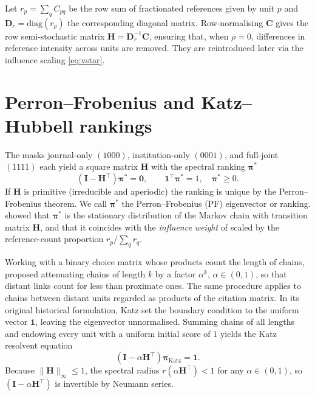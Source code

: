 Let $r_p=\sum_q C_{pq}$ be the row sum of fractionated references given by unit $p$
and $\mathbf{D}_r=\mathrm{diag}(r_p)$ the corresponding diagonal matrix.
Row-normalising $\mathbf{C}$ gives the row semi-stochastic matrix
$\mathbf{H}=\mathbf{D}_r^{-1}\mathbf{C}$, ensuring that, when $\rho = 0$, differences in reference intensity across units are removed. They are reintroduced later
via the influence scaling \eqref{eq:vstar}. 

\section{Perron--Frobenius and Katz--Hubbell rankings}
\label{sec:resolvents}

The masks journal-only $(1000)$, institution-only $(0001)$, and full-joint $(1111)$
each yield a square matrix $\mathbf{H}$ with the spectral
ranking $\boldsymbol{\pi}^*$ \citep[see][for an overview]{vignaSpectralRanking2016}
\begin{equation}
	(\mathbf{I} - \mathbf{H}^\top)\boldsymbol{\pi}^* = \mathbf{0},
	\qquad
	\mathbf{1}^\top\boldsymbol{\pi}^*=1,
	\quad
	\boldsymbol{\pi}^*\ge 0.
	\label{eq:eig}
\end{equation}
If $\mathbf{H}$ is primitive (irreducible and aperiodic) the ranking is unique by the
Perron--Frobenius theorem. We call $\boldsymbol{\pi}^*$ the Perron--Frobenius (PF) eigenvector or ranking. \textcite{gellerCitationInfluenceMethodology1978} showed that
$\boldsymbol{\pi}^*$ is the stationary distribution of the
Markov chain with transition matrix $\mathbf{H}$, and that it coincides
with the \textit{influence weight} of \textcite{pinskiCitationInfluenceJournal1976}
scaled by the reference-count proportion $r_p / \sum_q r_q$.

Working with a binary choice matrix whose products count the length of chains, \textcite{katzNewStatusIndex1953} proposed attenuating chains of length $k$ by a factor $\alpha^k$, $\alpha\in(0,1)$, so that distant links count for less than proximate ones. The same procedure applies to chains between distant units regarded as products of the citation matrix. In its original historical formulation, Katz set the boundary condition \citep{vignaSpectralRanking2016} to the uniform vector $\mathbf{1}$, leaving the eigenvector unnormalised.
Summing chains of all lengths and endowing every unit with a
uniform initial score of $1$ yields the Katz resolvent equation
\[
	(\mathbf{I} - \alpha\mathbf{H}^\top)\boldsymbol{\pi}_\text{Katz} = \mathbf{1}.
\]
Because $\|\mathbf{H}\|_\infty\leq 1$, the spectral radius $r(\alpha\mathbf{H}^\top)<1$ for any $\alpha\in(0,1)$, so $(\mathbf{I}-\alpha\mathbf{H}^\top)$ is invertible by Neumann series.

